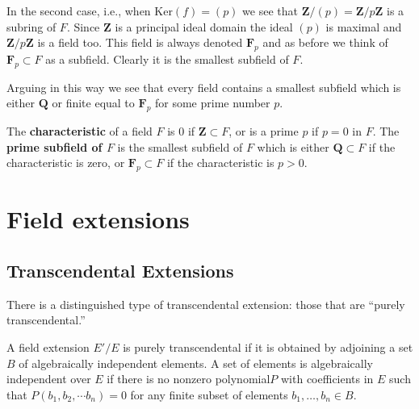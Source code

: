 In the second case, i.e., when $\text{Ker}(f) = (p)$ we see that
$\mathbf{Z}/(p) = \mathbf{Z}/p\mathbf{Z}$ is a subring of $F$. Since
$\mathbf{Z}$ is a principal ideal domain the ideal $(p)$ is maximal
and $\mathbf{Z}/p\mathbf{Z}$ is a field too. This field is always denoted
$\mathbf{F}_p$ and as before we think of $\mathbf{F}_p \subset F$
as a subfield. Clearly it is the smallest subfield of $F$.

Arguing in this way we see that every field contains a smallest subfield
which is either $\mathbf{Q}$ or finite equal to $\mathbf{F}_p$ for some
prime number $p$.

\begin{definition}
The \textbf{characteristic} of a field $F$ is $0$ if
$\mathbf{Z} \subset F$, or is a prime $p$ if $p = 0$ in $F$.
The \textbf{prime subfield of $F$} is the smallest subfield of $F$
which is either $\mathbf{Q} \subset F$ if the characteristic is zero, or
$\mathbf{F}_p \subset F$ if the characteristic is $p > 0$.
\end{definition}

\section{Field extensions}



\subsection{Transcendental Extensions}
There is a distinguished type of transcendental extension: those that are
``purely transcendental.'' 
\begin{definition} A field extension $E'/E$ is purely transcendental if it is
obtained by adjoining a set $B$ of algebraically independent elements. A set of
elements is algebraically independent over $E$ if there is no nonzero polynomial$P$
with coefficients in $E$ such
that $P(b_1,b_2,\cdots b_n)=0$ for any finite subset of elements $b_1, \dots,
b_n \in B$.
\end{definition}

